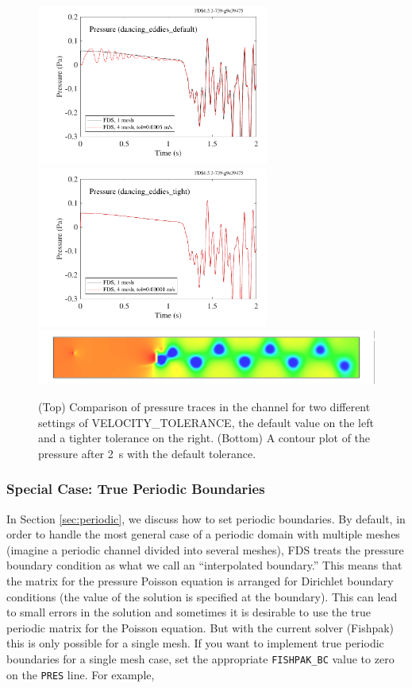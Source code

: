 \documentclass[11pt]{book}
\begin{document}
\begin{figure}[ht]
\begin{center}
\includegraphics[width=3in]{SCRIPT_FIGURES/dancing_eddies_default}
\includegraphics[width=3in]{SCRIPT_FIGURES/dancing_eddies_tight}
\includegraphics[width=\textwidth]{SCRIPT_FIGURES/dancing_eddies}
\end{center}
\caption[Results of the {\ct dancing\_eddies} test cases]{(Top) Comparison of pressure traces in the channel for two different settings
of {\ct VELOCITY\_TOLERANCE}, the default value on the left and a tighter tolerance on the right. (Bottom) A contour plot of the pressure after 2~s with the default tolerance.}
\label{dancing_eddies}
\end{figure}

\subsubsection{Special Case: True Periodic Boundaries}

In Section \ref{sec:periodic}, we discuss how to set periodic boundaries.  By default, in order to handle the most general case of a periodic domain with multiple meshes (imagine a periodic channel divided into several meshes), FDS treats the pressure boundary condition as what we call an ``interpolated boundary.''  This means that the matrix for the pressure Poisson equation is arranged for Dirichlet boundary conditions (the value of the solution is specified at the boundary).  This can lead to small errors in the solution and sometimes it is desirable to use the true periodic matrix for the Poisson equation.  But with the current solver (Fishpak) this is only possible for a single mesh.  If you want to implement true periodic boundaries for a single mesh case, set the appropriate \verb=FISHPAK_BC= value to zero on the \verb=PRES= line.  For example,
\end{document}
